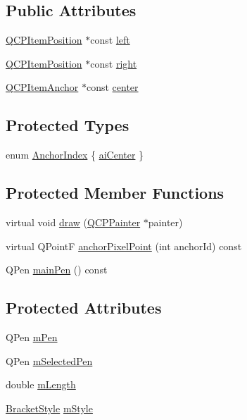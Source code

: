\subsection*{Public Attributes}
\begin{DoxyCompactItemize}
\item 
\hyperlink{classQCPItemPosition}{Q\+C\+P\+Item\+Position} $\ast$const \hyperlink{classQCPItemBracket_af6cc6d27d96171778c6927d6edce48b0}{left}
\item 
\hyperlink{classQCPItemPosition}{Q\+C\+P\+Item\+Position} $\ast$const \hyperlink{classQCPItemBracket_afa6c1360b05a50c4e0df37b3cebab6be}{right}
\item 
\hyperlink{classQCPItemAnchor}{Q\+C\+P\+Item\+Anchor} $\ast$const \hyperlink{classQCPItemBracket_a2dbcabdf5f467f28be12a7b25962ffca}{center}
\end{DoxyCompactItemize}
\subsection*{Protected Types}
\begin{DoxyCompactItemize}
\item 
enum \hyperlink{classQCPItemBracket_a7f3a6a56d67f71219ed220553f3dd861}{Anchor\+Index} \{ \hyperlink{classQCPItemBracket_a7f3a6a56d67f71219ed220553f3dd861a17b57ef34cc05eadfe9becd1ad5b5242}{ai\+Center}
 \}
\end{DoxyCompactItemize}
\subsection*{Protected Member Functions}
\begin{DoxyCompactItemize}
\item 
virtual void \hyperlink{classQCPItemBracket_a8343cf0559c64886add7aa7f4b22f1a6}{draw} (\hyperlink{classQCPPainter}{Q\+C\+P\+Painter} $\ast$painter)
\item 
virtual Q\+PointF \hyperlink{classQCPItemBracket_ac76827e3acba5faee81f149af4047a39}{anchor\+Pixel\+Point} (int anchor\+Id) const 
\item 
Q\+Pen \hyperlink{classQCPItemBracket_a8df4ad873bf88a4a7bfb9bbbd490e495}{main\+Pen} () const 
\end{DoxyCompactItemize}
\subsection*{Protected Attributes}
\begin{DoxyCompactItemize}
\item 
Q\+Pen \hyperlink{classQCPItemBracket_a350c864a5853b04343719f5a8be6b675}{m\+Pen}
\item 
Q\+Pen \hyperlink{classQCPItemBracket_adcfb53602d1802d00e2de4fd6df6b291}{m\+Selected\+Pen}
\item 
double \hyperlink{classQCPItemBracket_ab3d99bba8da18eb4d0e0cb23dded33b2}{m\+Length}
\item 
\hyperlink{classQCPItemBracket_a7ac3afd0b24a607054e7212047d59dbd}{Bracket\+Style} \hyperlink{classQCPItemBracket_ac911907184c824d621f274f8e0990080}{m\+Style}
\end{DoxyCompactItemize}
